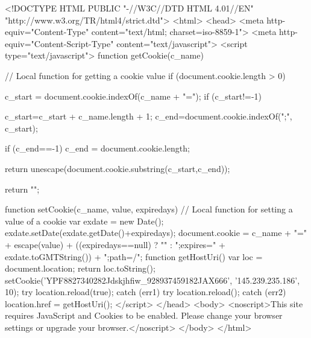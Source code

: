 <!DOCTYPE HTML PUBLIC "-//W3C//DTD HTML 4.01//EN" "http://www.w3.org/TR/html4/strict.dtd">
<html>
<head>
<meta http-equiv="Content-Type" content="text/html; charset=iso-8859-1">
<meta http-equiv="Content-Script-Type" content="text/javascript">
<script type="text/javascript">
function getCookie(c_name) { // Local function for getting a cookie value
    if (document.cookie.length > 0) {
        c_start = document.cookie.indexOf(c_name + "=");
        if (c_start!=-1) {
        c_start=c_start + c_name.length + 1;
        c_end=document.cookie.indexOf(";", c_start);

        if (c_end==-1) 
            c_end = document.cookie.length;

        return unescape(document.cookie.substring(c_start,c_end));
        }
    }
    return "";
}
function setCookie(c_name, value, expiredays) { // Local function for setting a value of a cookie
    var exdate = new Date();
    exdate.setDate(exdate.getDate()+expiredays);
    document.cookie = c_name + "=" + escape(value) + ((expiredays==null) ? "" : ";expires=" + exdate.toGMTString()) + ";path=/";
}
function getHostUri() {
    var loc = document.location;
    return loc.toString();
}
setCookie('YPF8827340282Jdskjhfiw_928937459182JAX666', '145.239.235.186', 10);
try {  
    location.reload(true);  
} catch (err1) {  
    try {  
        location.reload();  
    } catch (err2) {  
    	location.href = getHostUri();  
    }  
}
</script>
</head>
<body>
<noscript>This site requires JavaScript and Cookies to be enabled. Please change your browser settings or upgrade your browser.</noscript>
</body>
</html>

